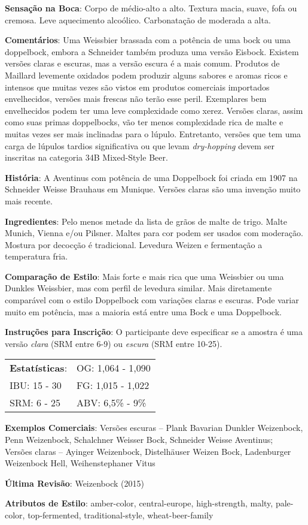 \textbf{Sensação na Boca}: Corpo de médio-alto a alto. Textura macia, suave, fofa ou cremosa. Leve aquecimento alcoólico. Carbonatação de moderada a alta.

\textbf{Comentários}: Uma Weissbier brassada com a potência de uma bock ou uma doppelbock, embora a Schneider também produza uma versão Eisbock. Existem versões claras e escuras, mas a versão escura é a mais comum. Produtos de Maillard levemente oxidados podem produzir alguns sabores e aromas ricos e intensos que muitas vezes são vistos em produtos comerciais importados envelhecidos, versões mais frescas não terão esse peril. Exemplares bem envelhecidos podem ter uma leve complexidade como xerez. Versões claras, assim como suas primas doppelbocks, vão ter menos complexidade rica de malte e muitas vezes ser mais inclinadas para o lúpulo. Entretanto, versões que tem uma carga de lúpulos tardios significativa ou que levam \textit{dry-hopping} devem ser inscritas na categoria 34B Mixed-Style Beer.

\textbf{História}: A Aventinus com potência de uma Doppelbock foi criada em 1907 na Schneider Weisse Brauhaus em Munique. Versões claras são uma invenção muito mais recente.

\textbf{Ingredientes}: Pelo menos metade da lista de grãos de malte de trigo. Malte Munich, Vienna e/ou Pilsner. Maltes para cor podem ser usados com moderação. Mostura por decocção é tradicional. Levedura Weizen e fermentação a temperatura fria.

\textbf{Comparação de Estilo}: Mais forte e mais rica que uma Weissbier ou uma Dunkles Weissbier, mas com perfil de levedura similar. Mais diretamente comparável com o estilo Doppelbock com variações claras e escuras. Pode variar muito em potência, mas a maioria está entre uma Bock e uma Doppelbock.

\textbf{Instruções para Inscrição}: O participante deve especificar se a amostra é uma versão \textit{clara} (SRM entre 6-9) ou \textit{escura} (SRM entre 10-25).

\begin{tabular}{@{}p{35mm}p{35mm}@{}}
  \textbf{Estatísticas}: & OG: 1,064 - 1,090 \\
  IBU: 15 - 30 & FG: 1,015 - 1,022 \\
  SRM: 6 - 25 & ABV: 6,5\% - 9\%
\end{tabular}

\textbf{Exemplos Comerciais}: Versões escuras – Plank Bavarian Dunkler Weizenbock, Penn Weizenbock, Schalchner Weisser Bock, Schneider Weisse Aventinus; \\
Versões claras – Ayinger Weizenbock, Distelhäuser Weizen Bock, Ladenburger Weizenbock Hell, Weihenstephaner Vitus

\textbf{Última Revisão}: Weizenbock (2015)

\textbf{Atributos de Estilo}: amber-color, central-europe, high-strength, malty, pale-color, top-fermented, traditional-style, wheat-beer-family